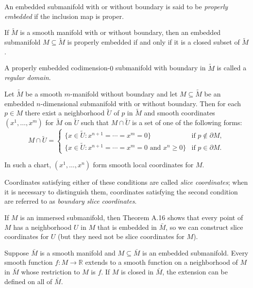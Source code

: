 An embedded submanifold with or without boundary is said to be \emph{properly embedded} if the inclusion map is proper.

\begin{proposition}
\label{prop:properly-embedded-closed}

If $\tilde{M}$ is a smooth manifold with or without boundary, then an embedded submanifold $M \subseteq \tilde{M}$ is properly embedded if and only if it is a closed subset of $\tilde{M}$.
\end{proposition}

A properly embedded codimension-$0$ submanifold with boundary in $\tilde{M}$ is called a \emph{regular domain}.

\begin{proposition}
\label{prop:slice-coordinates}

Let $\tilde{M}$ be a smooth $m$-manifold without boundary and let $M \subseteq \tilde{M}$ be an embedded $n$-dimensional submanifold with or without boundary. Then for each $p \in M$ there exist a neighborhood $\tilde{U}$ of $p$ in $\tilde{M}$ and smooth coordinates $(x^1, \ldots, x^m)$ for $\tilde{M}$ on $\tilde{U}$ such that $M \cap \tilde{U}$ is a set of one of the following forms:
\[
M \cap \tilde{U} = \begin{cases}
\{x \in \tilde{U} : x^{n+1} = \cdots = x^m = 0\} & \text{if } p \notin \partial M, \\
\{x \in \tilde{U} : x^{n+1} = \cdots = x^m = 0 \text{ and } x^n \geq 0\} & \text{if } p \in \partial M.
\end{cases}
\]

In such a chart, $(x^1, \ldots, x^n)$ form smooth local coordinates for $M$.
\end{proposition}

Coordinates satisfying either of these conditions are called \emph{slice coordinates}; when it is necessary to distinguish them, coordinates satisfying the second condition are referred to as \emph{boundary slice coordinates}.

If $M$ is an immersed submanifold, then Theorem A.16 shows that every point of $M$ has a neighborhood $U$ in $M$ that is embedded in $\bar{M}$, so we can construct slice coordinates for $U$ (but they need not be slice coordinates for $M$).

\begin{proposition}
\label{prop:extension-smooth-function}
Suppose $\bar{M}$ is a smooth manifold and $M \subseteq \bar{M}$ is an
embedded submanifold. Every smooth function $f:M\to\mathbb{R}$ extends to a
smooth function on a neighborhood of $M$ in $\bar{M}$ whose restriction to
$M$ is $f$. If $M$ is closed in $\bar{M}$, the extension can be defined on all
of $\bar{M}$.
\end{proposition}

